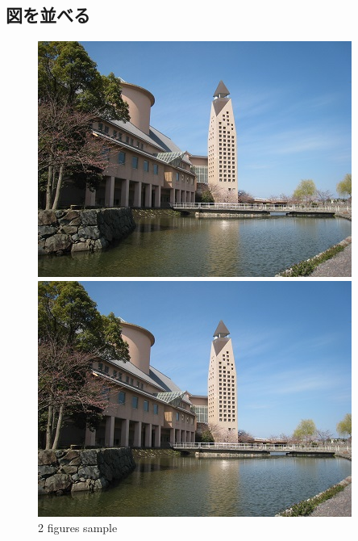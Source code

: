 \documentclass[uplatex,11pt,a4j]{jsarticle}
\begin{document}
\subsection{図を並べる}
\begin{figure}[htbp]
  \centering
  \begin{minipage}{0.48\hsize}
    \includegraphics[width=\hsize]{./figures/kendai_a22.jpg}
  \end{minipage}
  \begin{minipage}{0.48\hsize}
    \includegraphics[width=\hsize]{./figures/kendai_a22.jpg}
  \end{minipage}
  \caption{2 figures sample}
\end{figure}
\end{document}
